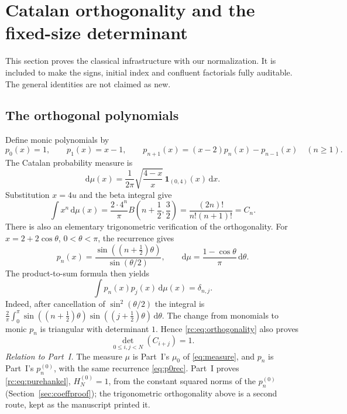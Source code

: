 \documentclass[11pt,a4paper]{article}
\numberwithin{equation}{section}
\theoremstyle{definition}
\theoremstyle{remark}
\newcommand{\dd}{\mathrm d}
\begin{document}
\section{Catalan orthogonality and the fixed-size determinant}\label{rc:sec:classical}

This section proves the classical infrastructure with our normalization.
It is included to make the signs, initial index and confluent factorials
fully auditable.  The general identities are not claimed as new.

\subsection{The orthogonal polynomials}
Define monic polynomials by
\begin{equation}\label{rc:eq:prec}
 p_0(x)=1,\qquad p_1(x)=x-1,\qquad
 p_{n+1}(x)=(x-2)p_n(x)-p_{n-1}(x)\quad(n\ge1).
\end{equation}
The Catalan probability measure is
\begin{equation}\label{rc:eq:measure}
 \dd\mu(x)=\frac1{2\pi}\sqrt{\frac{4-x}{x}}\,
                       \mathbf1_{(0,4)}(x)\,\dd x.
\end{equation}
Substitution $x=4u$ and the beta integral give
\[
 \int x^n\,\dd\mu(x)
 =\frac{2\cdot4^n}{\pi}B\left(n+\frac12,\frac32\right)
 =\frac{(2n)!}{n!(n+1)!}=C_n.
\]
There is also an elementary trigonometric verification of the orthogonality.
For $x=2+2\cos\theta$, $0<\theta<\pi$, the recurrence gives
\begin{equation}\label{rc:eq:ptrig}
 p_n(x)=\frac{\sin((n+\tfrac12)\theta)}{\sin(\theta/2)},
 \qquad \dd\mu=\frac{1-\cos\theta}{\pi}\,\dd\theta.
\end{equation}
The product-to-sum formula then yields
\begin{equation}\label{rc:eq:orthogonality}
 \int p_n(x)p_j(x)\,\dd\mu(x)=\delta_{n,j}.
\end{equation}
Indeed, after cancellation of $\sin^2(\theta/2)$ the integral is
$\frac2\pi\int_0^\pi\sin((n+\tfrac12)\theta)
\sin((j+\tfrac12)\theta)\,\dd\theta$.
The change from monomials to monic $p_n$ is triangular with determinant
$1$.  Hence \eqref{rc:eq:orthogonality} also proves
\begin{equation}\label{rc:eq:purehankel}
 \det_{0\le i,j<N}(C_{i+j})=1.
\end{equation}
\noindent\emph{Relation to Part~I.}  The measure $\mu$ is Part~I's
$\mu_0$ of \eqref{eq:measure}, and $p_n$ is Part~I's $p_n^{(0)}$, with the
same recurrence \eqref{eq:p0rec}.  Part~I proves
\eqref{rc:eq:purehankel}, $H_N^{(0)}=1$, from the constant squared norms
of the $p_n^{(0)}$ (Section~\ref{sec:coeffproof}); the trigonometric
orthogonality above is a second route, kept as the manuscript printed it.
\end{document}
